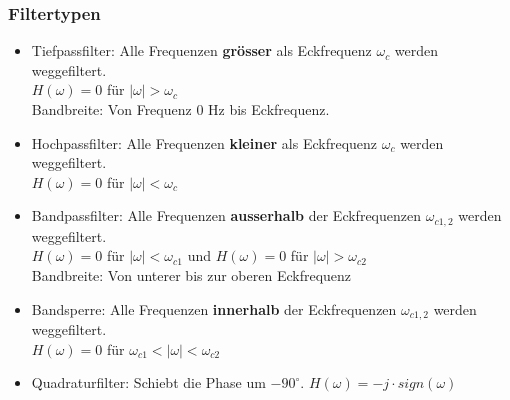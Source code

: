 \begin{multicols}{2}
    \subsubsection*{Filtertypen}
    \begin{itemize}
        \item Tiefpassfilter: Alle Frequenzen \textbf{grösser} als Eckfrequenz $\omega_c$ werden weggefiltert.
        \\ $H(\omega) = 0$ für $|\omega| > \omega_c$
        \\ Bandbreite: Von Frequenz 0 Hz bis Eckfrequenz.
        \item Hochpassfilter: Alle Frequenzen \textbf{kleiner} als Eckfrequenz $\omega_c$ werden weggefiltert.
        \\ $H(\omega) = 0$ für $|\omega| < \omega_c$
        \item Bandpassfilter: Alle Frequenzen \textbf{ausserhalb} der Eckfrequenzen $\omega_{c1,2}$ werden weggefiltert.
        \\ $H(\omega) = 0$ für $|\omega| < \omega_{c1}$  und $H(\omega) = 0$ für $|\omega| > \omega_{c2}$
        \\ Bandbreite: Von unterer bis zur oberen Eckfrequenz
        \item Bandsperre: Alle Frequenzen \textbf{innerhalb} der Eckfrequenzen $\omega_{c1,2}$ werden weggefiltert.
        \\ $H(\omega) = 0$ für $\omega_{c1} < |\omega| < \omega_{c2}$
        \item Quadraturfilter: Schiebt die Phase um $-90^{\circ}$.
        $H(\omega) = -j \cdot sign(\omega)$
    \end{itemize}

\end{multicols}
